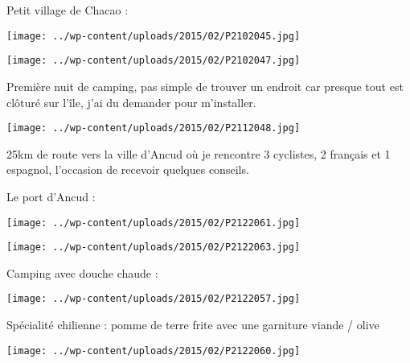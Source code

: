 \pagebreak
 Petit village de Chacao :
\begin{center} \texttt{[image: ../wp-content/uploads/2015/02/P2102045.jpg]} \end{center}
\begin{center} \texttt{[image: ../wp-content/uploads/2015/02/P2102047.jpg]} \end{center}

\pagebreak
 Première nuit de camping, pas simple de trouver un endroit car presque tout est clôturé sur l'île, j'ai du demander pour m'installer. 
\begin{center} \texttt{[image: ../wp-content/uploads/2015/02/P2112048.jpg]} \end{center}

 25km de route vers la ville d'Ancud où je rencontre 3 cyclistes, 2 français et 1 espagnol, l'occasion de recevoir quelques conseils.

 Le port d'Ancud :
\begin{center} \texttt{[image: ../wp-content/uploads/2015/02/P2122061.jpg]} \end{center}
\begin{center} \texttt{[image: ../wp-content/uploads/2015/02/P2122063.jpg]} \end{center}

 Camping avec douche chaude :
\begin{center} \texttt{[image: ../wp-content/uploads/2015/02/P2122057.jpg]} \end{center}

\pagebreak
Spécialité chilienne : pomme de terre frite avec une garniture viande / olive
\begin{center} \texttt{[image: ../wp-content/uploads/2015/02/P2122060.jpg]} \end{center}